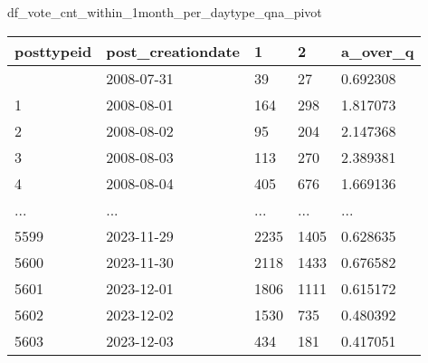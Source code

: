\documentclass[
  letterpaper,
  DIV=11,
  numbers=noendperiod]{scrartcl}
\newenvironment{Shaded}{\begin{snugshade}}{\end{snugshade}}
\newcommand{\NormalTok}[1]{\textcolor[rgb]{0.00,0.23,0.31}{#1}}
\begin{document}
\begin{Shaded}
\begin{Highlighting}[]
\NormalTok{df\_vote\_cnt\_within\_1month\_per\_daytype\_qna\_pivot}
\end{Highlighting}
\end{Shaded}

\begin{longtable}[]{@{}lllll@{}}
\toprule\noalign{}
posttypeid & post\_creationdate & 1 & 2 & a\_over\_q \\
\midrule\noalign{}
\endhead
\bottomrule\noalign{}
\endlastfoot
0 & 2008-07-31 & 39 & 27 & 0.692308 \\
1 & 2008-08-01 & 164 & 298 & 1.817073 \\
2 & 2008-08-02 & 95 & 204 & 2.147368 \\
3 & 2008-08-03 & 113 & 270 & 2.389381 \\
4 & 2008-08-04 & 405 & 676 & 1.669136 \\
... & ... & ... & ... & ... \\
5599 & 2023-11-29 & 2235 & 1405 & 0.628635 \\
5600 & 2023-11-30 & 2118 & 1433 & 0.676582 \\
5601 & 2023-12-01 & 1806 & 1111 & 0.615172 \\
5602 & 2023-12-02 & 1530 & 735 & 0.480392 \\
5603 & 2023-12-03 & 434 & 181 & 0.417051 \\
\end{longtable}
\end{document}

